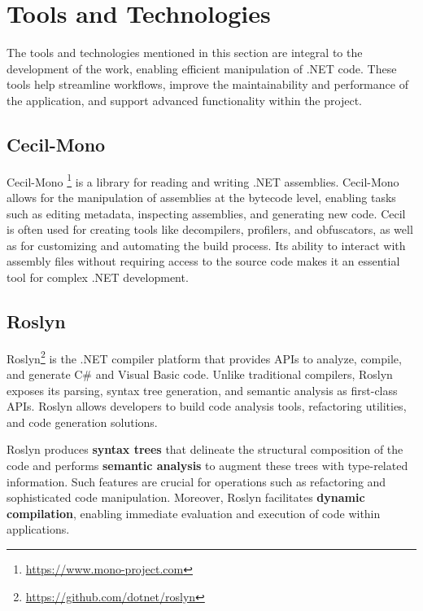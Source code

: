 \section{Tools and Technologies}

The tools and technologies mentioned in this section are integral to the development of the work, enabling efficient manipulation of .NET code. These tools help streamline workflows, improve the maintainability and performance of the application, and support advanced functionality within the project.

\subsection{Cecil-Mono}
Cecil-Mono \footnote{\href{https://www.mono-project.com/docs/tools+libraries/libraries/Mono.Cecil/}{https://www.mono-project.com}} is a library for reading and writing .NET assemblies. Cecil-Mono allows for the manipulation of assemblies at the bytecode level, enabling tasks such as editing metadata, inspecting assemblies, and generating new code. Cecil is often used for creating tools like decompilers, profilers, and obfuscators, as well as for customizing and automating the build process. Its ability to interact with assembly files without requiring access to the source code makes it an essential tool for complex .NET development.

\subsection{Roslyn}

Roslyn\footnote{\href{https://github.com/dotnet/roslyn}{https://github.com/dotnet/roslyn}} is the .NET compiler platform that provides APIs to analyze, compile, and generate C\# and Visual Basic code. Unlike traditional compilers, Roslyn exposes its parsing, syntax tree generation, and semantic analysis as first-class APIs. Roslyn allows developers to build code analysis tools, refactoring utilities, and code generation solutions.

Roslyn produces \textbf{syntax trees} that delineate the structural composition of the code and performs \textbf{semantic analysis} to augment these trees with type-related information. Such features are crucial for operations such as refactoring and sophisticated code manipulation. Moreover, Roslyn facilitates \textbf{dynamic compilation}, enabling immediate evaluation and execution of code within applications.




